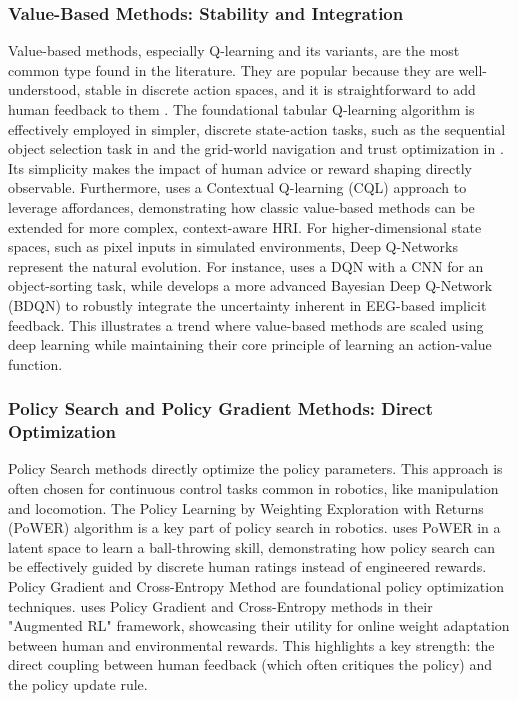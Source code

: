 \documentclass[rnd]{mas_proposal}
\begin{document}
\subsubsection {Value-Based Methods: Stability and Integration}
Value-based methods, especially Q-learning and its variants, are the most common type found in the literature. They are popular because they are well-understood, stable in discrete action spaces, and it is straightforward to add human feedback to them \citep{Lin2020}. The foundational tabular Q-learning algorithm is effectively employed in simpler, discrete state-action tasks, such as the sequential object selection task in \citet{9794595} and the grid-world navigation and trust optimization in \citet{Alzahrani2025}. Its simplicity makes the impact of human advice or reward shaping directly observable. Furthermore, \citet{MunguiaGaleano2023} uses a Contextual Q-learning (CQL) approach to leverage affordances, demonstrating how classic value-based methods can be extended for more complex, context-aware HRI. For higher-dimensional state spaces, such as pixel inputs in simulated environments, Deep Q-Networks represent the natural evolution. For instance, \citet{Moreira2020} uses a DQN with a CNN for an object-sorting task, while \citet{Xu2021} develops a more advanced Bayesian Deep Q-Network (BDQN) to robustly integrate the uncertainty inherent in EEG-based implicit feedback. This illustrates a trend where value-based methods are scaled using deep learning while maintaining their core principle of learning an action-value function.


\subsubsection{Policy Search and Policy Gradient Methods: Direct Optimization}
Policy Search methods directly optimize the policy parameters. This approach is often chosen for continuous control tasks common in robotics, like manipulation and locomotion. The Policy Learning by Weighting Exploration with Returns (PoWER) algorithm is a key part of policy search in robotics. \citet{8624972} uses PoWER in a latent space to learn a ball-throwing skill, demonstrating how policy search can be effectively guided by discrete human ratings instead of engineered rewards. Policy Gradient and Cross-Entropy Method are foundational policy optimization techniques. \citet{6147010} uses Policy Gradient and Cross-Entropy methods in their "Augmented RL" framework, showcasing their utility for online weight adaptation between human and environmental rewards. This highlights a key strength: the direct coupling between human feedback (which often critiques the policy) and the policy update rule.
\end{document}

